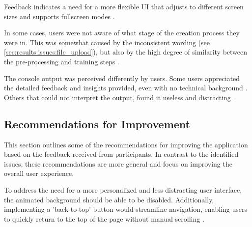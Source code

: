 
Feedback indicates a need for a more flexible UI that adjusts to different screen sizes and supports fullscreen modes \cite{P10}.

In some cases, users were not aware of what stage of the creation process they were in.
This was somewhat caused by the inconsistent wording (see \ref{sec:results:issues:file_upload}), but also by the high degree of similarity between the pre-processing and training steps \cite{P2}.


The console output was perceived differently by users. 
Some users appreciated the detailed feedback and insights provided, even with no technical background \cite{P5}.
Others that could not interpret the output, found it useless and distracting \cite{P3, P4}.


\subsection*{Recommendations for Improvement}
\label{sec:results:recommendations}

This section outlines some of the recommendations for improving the application based on the feedback received from participants. 
In contrast to the identified issues, these recommendations are more general and focus on improving the overall user experience.

To address the need for a more personalized and less distracting user interface, the animated background should be able to be disabled.
Additionally, implementing a 'back-to-top' button would streamline navigation, enabling users to quickly return to the top of the page without manual scrolling \cite{P10}. 

